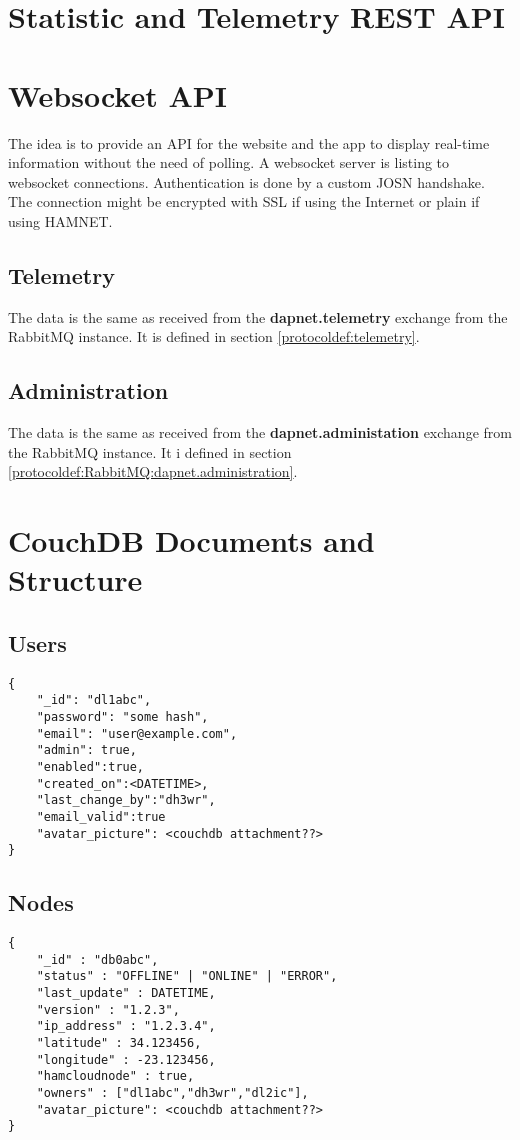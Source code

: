 \section{Statistic and Telemetry REST API}

\section{Websocket API}
\label{protocoldef:websocketapi}
The idea is to provide an API for the website and the app to display real-time information without the need of polling. A websocket server is listing to websocket connections. Authentication is done by a custom JOSN handshake. The connection might be encrypted with SSL if using the Internet or plain if using HAMNET.

\subsection{Telemetry}
\label{protcoldef:websocketapi:telemetry}
The data is the same as received from the \textbf{dapnet.telemetry} exchange from the RabbitMQ instance. It is defined in section \ref{protocoldef:telemetry}.

\subsection{Administration}
\label{protcoldef:websocketapi:administration}
The data is the same as received from the \textbf{dapnet.administation} exchange from the RabbitMQ instance. It i defined in section \ref{protocoldef:RabbitMQ:dapnet.administration}.

\section{CouchDB Documents and Structure}
\subsection{Users}

\begin{lstlisting}
{
	"_id": "dl1abc",
	"password": "some hash",
    "email": "user@example.com",
    "admin": true,
    "enabled":true,
    "created_on":<DATETIME>,
    "last_change_by":"dh3wr",
    "email_valid":true
    "avatar_picture": <couchdb attachment??>
}
\end{lstlisting}

\subsection{Nodes}
\begin{lstlisting}
{
	"_id" : "db0abc",
	"status" : "OFFLINE" | "ONLINE" | "ERROR",
	"last_update" : DATETIME,
    "version" : "1.2.3",
    "ip_address" : "1.2.3.4",
    "latitude" : 34.123456,
    "longitude" : -23.123456,
    "hamcloudnode" : true,
    "owners" : ["dl1abc","dh3wr","dl2ic"],
    "avatar_picture": <couchdb attachment??>
}
\end{lstlisting}

